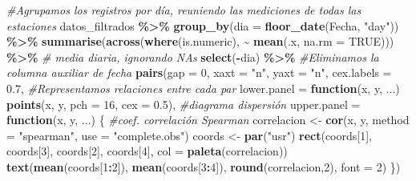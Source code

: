 \documentclass[notspecified,article,submit,oneauthor,pdftex]{Definitions/mdpi}
\newenvironment{Shaded}{\begin{snugshade}}{\end{snugshade}}
\newcommand{\AttributeTok}[1]{\textcolor[rgb]{0.13,0.29,0.53}{#1}}
\newcommand{\CommentTok}[1]{\textcolor[rgb]{0.56,0.35,0.01}{\textit{#1}}}
\newcommand{\ConstantTok}[1]{\textcolor[rgb]{0.56,0.35,0.01}{#1}}
\newcommand{\ControlFlowTok}[1]{\textcolor[rgb]{0.13,0.29,0.53}{\textbf{#1}}}
\newcommand{\DecValTok}[1]{\textcolor[rgb]{0.00,0.00,0.81}{#1}}
\newcommand{\FloatTok}[1]{\textcolor[rgb]{0.00,0.00,0.81}{#1}}
\newcommand{\FunctionTok}[1]{\textcolor[rgb]{0.13,0.29,0.53}{\textbf{#1}}}
\newcommand{\NormalTok}[1]{#1}
\newcommand{\OtherTok}[1]{\textcolor[rgb]{0.56,0.35,0.01}{#1}}
\newcommand{\SpecialCharTok}[1]{\textcolor[rgb]{0.81,0.36,0.00}{\textbf{#1}}}
\newcommand{\StringTok}[1]{\textcolor[rgb]{0.31,0.60,0.02}{#1}}
\begin{document}
\begin{Shaded}
\begin{Highlighting}[]
\CommentTok{\#Agrupamos los registros por día, reuniendo las mediciones de todas las estaciones }
\NormalTok{datos\_filtrados }\SpecialCharTok{\%\textgreater{}\%}
  \FunctionTok{group\_by}\NormalTok{(}\AttributeTok{dia =} \FunctionTok{floor\_date}\NormalTok{(Fecha, }\StringTok{"day"}\NormalTok{)) }\SpecialCharTok{\%\textgreater{}\%}                            
  \FunctionTok{summarise}\NormalTok{(}\FunctionTok{across}\NormalTok{(}\FunctionTok{where}\NormalTok{(is.numeric), }\SpecialCharTok{\textasciitilde{}} \FunctionTok{mean}\NormalTok{(.x, }\AttributeTok{na.rm =} \ConstantTok{TRUE}\NormalTok{))) }\SpecialCharTok{\%\textgreater{}\%}  \CommentTok{\# media diaria, ignorando NAs}
  \FunctionTok{select}\NormalTok{(}\SpecialCharTok{{-}}\NormalTok{dia) }\SpecialCharTok{\%\textgreater{}\%}  \CommentTok{\#Eliminamos la columna auxiliar de fecha}
  \FunctionTok{pairs}\NormalTok{(}\AttributeTok{gap =} \DecValTok{0}\NormalTok{, }\AttributeTok{xaxt =} \StringTok{"n"}\NormalTok{, }\AttributeTok{yaxt =} \StringTok{"n"}\NormalTok{, }\AttributeTok{cex.labels =} \FloatTok{0.7}\NormalTok{, }\CommentTok{\#Representamos relaciones entre cada par }
        \AttributeTok{lower.panel =} \ControlFlowTok{function}\NormalTok{(x, y, ...) }\FunctionTok{points}\NormalTok{(x, y, }\AttributeTok{pch =} \DecValTok{16}\NormalTok{, }\AttributeTok{cex =} \FloatTok{0.5}\NormalTok{), }\CommentTok{\#diagrama dispersión}
        \AttributeTok{upper.panel =} \ControlFlowTok{function}\NormalTok{(x, y, ...) \{    }\CommentTok{\#coef. correlación Spearman}
\NormalTok{          correlacion }\OtherTok{\textless{}{-}} \FunctionTok{cor}\NormalTok{(x, y, }\AttributeTok{method =} \StringTok{"spearman"}\NormalTok{, }\AttributeTok{use =} \StringTok{"complete.obs"}\NormalTok{)        }
\NormalTok{          coords }\OtherTok{\textless{}{-}} \FunctionTok{par}\NormalTok{(}\StringTok{"usr"}\NormalTok{)}
          \FunctionTok{rect}\NormalTok{(coords[}\DecValTok{1}\NormalTok{], coords[}\DecValTok{3}\NormalTok{], coords[}\DecValTok{2}\NormalTok{], coords[}\DecValTok{4}\NormalTok{], }\AttributeTok{col =} \FunctionTok{paleta}\NormalTok{(correlacion))}
          \FunctionTok{text}\NormalTok{(}\FunctionTok{mean}\NormalTok{(coords[}\DecValTok{1}\SpecialCharTok{:}\DecValTok{2}\NormalTok{]), }\FunctionTok{mean}\NormalTok{(coords[}\DecValTok{3}\SpecialCharTok{:}\DecValTok{4}\NormalTok{]), }\FunctionTok{round}\NormalTok{(correlacion,}\DecValTok{2}\NormalTok{), }\AttributeTok{font =} \DecValTok{2}\NormalTok{)}
\NormalTok{          \})}
\end{Highlighting}
\end{Shaded}
\end{document}
